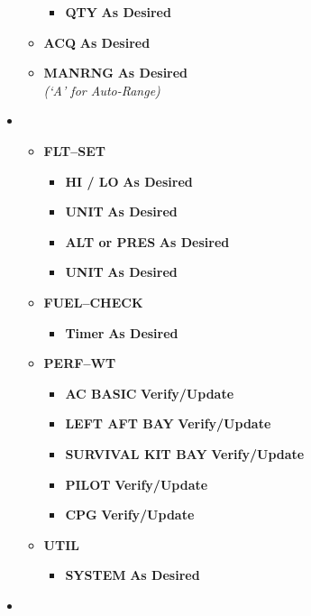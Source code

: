 \documentclass[fontHelvetica]{TechCheck}
\begin{document}
\begin{itemize}[leftmargin=0.1\linewidth,rightmargin=0.1\linewidth, itemsep=4pt]
\begin{itemize}[itemsep=4pt]
\begin{itemize}[itemsep=4pt]
				\item \textbf{QTY} \dotfill \textbf{As Desired}
			\end{itemize}
			\item \textbf{ACQ} \dotfill \textbf{As Desired}
			\item \textbf{MANRNG} \dotfill \textbf{As Desired} \\
			\hfill \emph{(`A' for Auto-Range)}
		\end{itemize}
		\item {}
		\begin{itemize}[itemsep=4pt]
			\item \textbf{FLT--SET}
			\begin{itemize}[itemsep=4pt]
				\item \textbf{HI / LO} \dotfill \textbf{As Desired}
				\item \textbf{UNIT} \dotfill \textbf{As Desired}
				\item \textbf{ALT or PRES} \dotfill \textbf{As Desired}
				\item \textbf{UNIT} \dotfill \textbf{As Desired}
			\end{itemize}
			\item \textbf{FUEL--CHECK}
			\begin{itemize}[itemsep=4pt]
				\item \textbf{Timer} \dotfill \textbf{As Desired}
			\end{itemize}
			\item \textbf{PERF--WT}
			\begin{itemize}[itemsep=4pt]
				\item \textbf{AC BASIC} \dotfill \textbf{Verify/Update}
				\item \textbf{LEFT AFT BAY} \dotfill \textbf{Verify/Update}
				\item \textbf{SURVIVAL KIT BAY} \dotfill \textbf{Verify/Update}
				\item \textbf{PILOT} \dotfill \textbf{Verify/Update}
				\item \textbf{CPG} \dotfill \textbf{Verify/Update}
			\end{itemize}
			\item \textbf{UTIL}
			\begin{itemize}[itemsep=4pt]
				\item \textbf{SYSTEM} \dotfill \textbf{As Desired}
			\end{itemize}
		\end{itemize}
		\item {}
		\begin{itemize}[itemsep=4pt]

\end{itemize}
\end{itemize}
\end{document}
